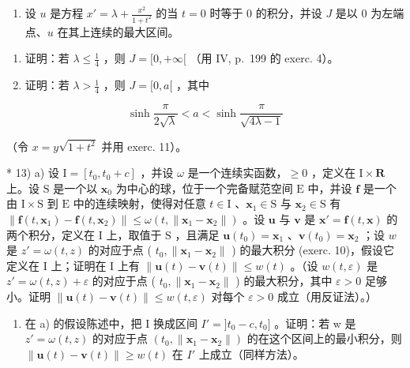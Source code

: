 \begin{enumerate}
\def\labelenumi{\arabic{enumi})}
\setcounter{enumi}{11}
\tightlist
\item
  设 \(u\) 是方程 \(x' = \lambda + \frac{x^2}{1 + t^2}\) 的当 \(t = 0\) 时等于 0 的积分，并设 \(J\) 是以 0 为左端点、\(u\) 在其上连续的最大区间。
\end{enumerate}

\begin{enumerate}
\def\labelenumi{\alph{enumi})}
\item
  证明：若 \(\lambda \leqslant \frac{1}{4}\) ，则 \(J = [0, +\infty[\) （用 IV, p.~199 的 exerc. 4）。
\item
  证明：若 \(\lambda >\frac{1}{4}\) ，则 \(J = [0,a[\) ，其中
\end{enumerate}

\[
\sinh \frac {\pi}{2 \sqrt {\lambda}} <   a <   \sinh \frac {\pi}{\sqrt {4 \lambda - 1}}
\]

（令 \(x = y\sqrt{1 + t^{2}}\) 并用 exerc. 11）。

* 13) a) 设 \(\mathrm{I} = [t_0, t_0 + c]\) ，并设 \(\omega\) 是一个连续实函数，\(\geqslant 0\) ，定义在 \(\mathrm{I} \times \mathbf{R}\) 上。设 \(\mathrm{S}\) 是一个以 \(\mathbf{x}_0\) 为中心的球，位于一个完备赋范空间 \(\mathrm{E}\) 中，并设 \(\mathbf{f}\) 是一个由 \(\mathrm{I} \times \mathrm{S}\) 到 \(\mathrm{E}\) 中的连续映射，使得对任意 \(t \in \mathrm{I}\) 、\(\mathbf{x}_1 \in \mathrm{S}\) 与 \(\mathbf{x}_2 \in \mathrm{S}\) 有 \(\| \mathbf{f}(t, \mathbf{x}_1) - \mathbf{f}(t, \mathbf{x}_2) \| \leqslant \omega(t, \| \mathbf{x}_1 - \mathbf{x}_2 \|)\) 。设 \(\mathbf{u}\) 与 \(\mathbf{v}\) 是 \(\mathbf{x}' = \mathbf{f}(t, \mathbf{x})\) 的两个积分，定义在 \(\mathrm{I}\) 上，取值于 \(\mathrm{S}\) ，且满足 \(\mathbf{u}(t_0) = \mathbf{x}_1\) 、\(\mathbf{v}(t_0) = \mathbf{x}_2\) ；设 \(w\) 是 \(z' = \omega(t, z)\) 的对应于点 ( \(t_0, \| \mathbf{x}_1 - \mathbf{x}_2 \|\) ) 的最大积分 (exerc. 10)，假设它定义在 \(\mathrm{I}\) 上；证明在 \(\mathrm{I}\) 上有 \(\| \mathbf{u}(t) - \mathbf{v}(t) \| \leqslant w(t)\) 。（设 \(w(t, \varepsilon)\) 是 \(z' = \omega(t, z) + \varepsilon\) 的对应于点 ( \(t_0, \| \mathbf{x}_1 - \mathbf{x}_2 \|\) ) 的最大积分，其中 \(\varepsilon > 0\) 足够小。证明 \(\| \mathbf{u}(t) - \mathbf{v}(t) \| \leqslant w(t, \varepsilon)\) 对每个 \(\varepsilon > 0\) 成立（用反证法）。）

\begin{enumerate}
\def\labelenumi{\alph{enumi})}
\setcounter{enumi}{1}
\tightlist
\item
  在 a) 的假设陈述中，把 I 换成区间 \(I' = ]t_{0} - c, t_{0}]\) 。证明：若 w 是 \(z' = \omega(t, z)\) 的对应于点 \((t_{0}, \| \mathbf{x}_{1} - \mathbf{x}_{2}\|)\) 的在这个区间上的最小积分，则 \(\| \mathbf{u}(t) - \mathbf{v}(t) \| \geqslant w(t)\) 在 \(I'\) 上成立（同样方法）。
\end{enumerate}

